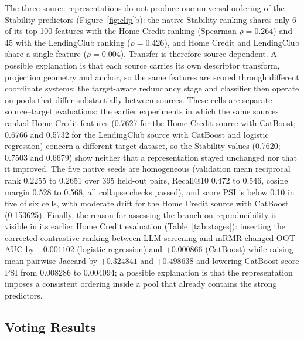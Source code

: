 \documentclass[final,5p,twocolumn]{elsarticle}
\begin{document}
The three source representations do not produce one universal ordering of the Stability predictors (Figure~\ref{fig:clip}b): the native Stability ranking shares only 6 of its top 100 features with the Home Credit ranking (Spearman $\rho=0.264$) and 45 with the LendingClub ranking ($\rho=0.426$), and Home Credit and LendingClub share a single feature ($\rho=0.004$). Transfer is therefore source-dependent. A possible explanation is that each source carries its own descriptor transform, projection geometry and anchor, so the same features are scored through different coordinate systems; the target-aware redundancy stage and classifier then operate on pools that differ substantially between sources. These cells are separate source--target evaluations: the earlier experiments in which the same sources ranked Home Credit features (0.7627 for the Home Credit source with CatBoost; 0.6766 and 0.5732 for the LendingClub source with CatBoost and logistic regression) concern a different target dataset, so the Stability values (0.7620; 0.7503 and 0.6679) show neither that a representation stayed unchanged nor that it improved. The five native seeds are homogeneous (validation mean reciprocal rank 0.2255 to 0.2651 over 395 held-out pairs, Recall@10 0.472 to 0.546, cosine margin 0.528 to 0.568, all collapse checks passed), and score PSI is below 0.10 in five of six cells, with moderate drift for the Home Credit source with CatBoost (0.153625). Finally, the reason for assessing the branch on reproducibility is visible in its earlier Home Credit evaluation (Table~\ref{tab:stages}): inserting the corrected contrastive ranking between LLM screening and mRMR changed OOT AUC by $-0.001102$ (logistic regression) and $+0.000866$ (CatBoost) while raising mean pairwise Jaccard by $+0.324841$ and $+0.498638$ and lowering CatBoost score PSI from 0.008286 to 0.004094; a possible explanation is that the representation imposes a consistent ordering inside a pool that already contains the strong predictors.

\subsection{Voting Results}
\label{subsec:voting_results}
\end{document}
